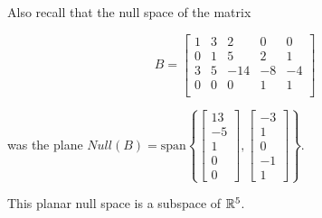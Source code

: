 \documentclass{ximera}
\begin{document}
\begin{example}

  Also recall that the null space of the matrix 

  $$B=\begin{bmatrix}
        1 & 3 & 2 & 0 & 0  \\
        0 & 1 & 5 & 2 & 1  \\
        3 & 5 & -14 & -8 &-4  \\
        0 & 0 & 0 & 1 & 1  \\
        \end{bmatrix}$$

  was the plane $Null(B)=\text{span}\left\{ \begin{bmatrix} 13 \\ -5 \\ 1 \\ 0 \\ 0 \end{bmatrix}, \begin{bmatrix} -3 \\ 1 \\ 0 \\ -1 \\ 1 \end{bmatrix} \right\}$.
  
  This planar null space is a subspace of $\mathbb{R}^5$.

\end{example}
\end{document}
